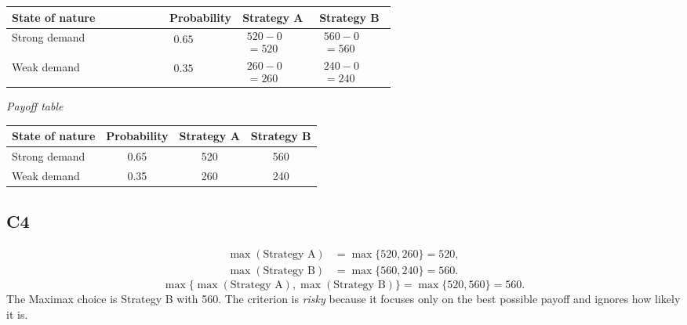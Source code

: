 \begin{ExamProblems}
\begin{center}
\begin{tabular}{l p{0.17\linewidth} p{0.2\linewidth} p{0.2\linewidth}}
				\toprule
				State of nature & Probability & Strategy A & Strategy B \\
				\midrule
				Strong demand &
				$\begin{array}{l}
					0.65
				\end{array}$ &
				$\begin{array}{l}
					520 - 0\\
					= 520
				\end{array}$ &
				$\begin{array}{l}
					560 - 0\\
					= 560
				\end{array}$ \\
				Weak demand &
				$\begin{array}{l}
					0.35
				\end{array}$ &
				$\begin{array}{l}
					260 - 0\\
					= 260
				\end{array}$ &
				$\begin{array}{l}
					240 - 0\\
					= 240
				\end{array}$ \\
				\bottomrule
		\end{tabular}
		\end{center}
		\begin{center}
			\textit{Payoff table} \\
			\begin{tabular}{l c c c}
				\toprule
				State of nature & Probability & Strategy A & Strategy B \\
				\midrule
				Strong demand & 0.65 & 520 & 560 \\
				Weak demand & 0.35 & 260 & 240 \\
				\bottomrule
		\end{tabular}
		\end{center}

		\subsection*{C4}
		\[
		\begin{aligned}
		\max(\text{Strategy A}) &= \max\{520,260\} = 520,\\
		\max(\text{Strategy B}) &= \max\{560,240\} = 560.
		\end{aligned}
		\]
		\[
		\max\{\max(\text{Strategy A}), \max(\text{Strategy B})\}
		= \max\{520, 560\}
		= 560.
		\]
		The Maximax choice is Strategy B with 560. The criterion is \emph{risky} because it focuses only on the best possible payoff and ignores how likely it is.


\end{ExamProblems}
